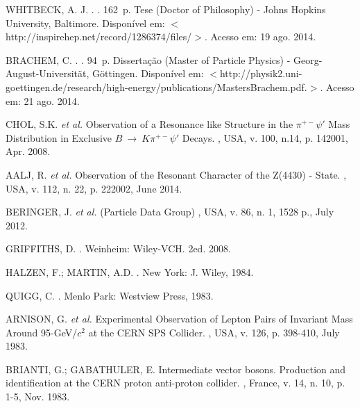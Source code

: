 \begin{thebibliography}{}

WHITBECK, A. J.
.
. 162~p. Tese (Doctor of Philosophy) - Johns Hopkins University, Baltimore. Disponível em: $<$http://inspirehep.net/record/1286374/files/$>$. Acesso em: 19 ago. 2014.

BRACHEM, C.
.
. 94~p. Dissertação (Master of Particle Physics) - Georg-August-Universität, Göttingen. Disponível em: $<$http://physik2.uni-goettingen.de/research/high-energy/publications/MastersBrachem.pdf.$>$. Acesso em: 21 ago. 2014.

CHOL, S.K. \textit{et al.}
\newblock Observation of a Resonance like Structure in the $\pi^{+-}\psi'$ Mass Distribution in Exclusive $B~\rightarrow~K\pi^{+-}\psi'$ Decays.
, USA, v. 100, n.14, p. 142001, Apr. 2008.

AALJ, R. \textit{et al.}
\newblock Observation of the Resonant Character of the Z(4430) - State.
, USA, v. 112, n. 22, p. 222002, June 2014.

BERINGER, J. \textit{et al.} (Particle Data Group)
, USA, v. 86, n. 1, 1528 p., July 2012.

GRIFFITHS, D.
.
\newblock Weinheim: Wiley-VCH. 2ed. 2008.

HALZEN, F.; MARTIN, A.D.
.
\newblock New York: J. Wiley, 1984.

QUIGG, C.
.
\newblock Menlo Park: Westview Press, 1983.

ARNISON, G. \textit{et al.}
\newblock Experimental Observation of Lepton Pairs of Invariant Mass Around 95-GeV/$c^2$ at the CERN SPS Collider.
, USA, v. 126, p. 398-410, July 1983.

BRIANTI, G.; GABATHULER, E.
\newblock Intermediate vector bosons. Production and identification at the CERN proton anti-proton collider.
, France, v. 14, n. 10, p. 1-5, Nov. 1983.


\end{thebibliography}
